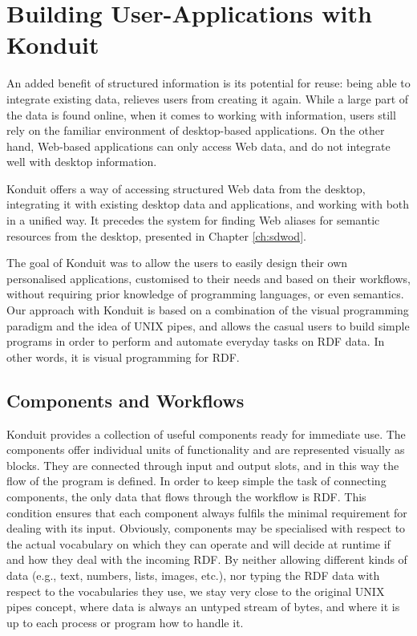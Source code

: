 \section{Building User-Applications with Konduit}

An added benefit of structured information is its potential for reuse: being able to integrate existing data, relieves users from creating it again. While a large part of the data is found online, when it comes to working with information, users still rely on the familiar environment of desktop-based applications. On the other hand, Web-based applications can only access Web data, and do not integrate well with desktop information.

Konduit \cite{Dragan2009b} offers a way of accessing structured Web data from the desktop, integrating it with existing desktop data and applications, and working with both in a unified way. It precedes the system for finding Web aliases for semantic resources from the desktop, presented in Chapter \ref{ch:sdwod}. 

The goal of Konduit was to allow the users to easily design their own personalised applications, customised to their needs and based on their workflows, without requiring prior knowledge of programming languages, or even semantics.
Our approach with Konduit is based on a combination of the visual programming paradigm and the idea of UNIX pipes, and allows the casual users to build simple programs in order to perform and automate everyday tasks on RDF data. In other words, it is visual programming for RDF. 

\subsection{Components and Workflows}
\label{sec:konduit_components_and_workflows}

Konduit provides a collection of useful components ready for immediate use. The components offer individual units of functionality and are represented visually as blocks. They are connected through input and output slots, and in this way the flow of the program is defined. In order to keep simple the task of connecting components, the only data that flows through the workflow is RDF. This condition ensures that each component always fulfils the minimal requirement for dealing with its input. Obviously, components may be specialised with respect to the actual vocabulary on which they can operate and will decide at runtime if and how they deal with the incoming RDF. By neither allowing different kinds of data (e.g., text, numbers, lists, images, etc.), nor typing the RDF data with respect to the vocabularies they use, we stay very close to the original UNIX pipes concept, where data is always an untyped stream of bytes, and where it is up to each process or program how to handle it. 

